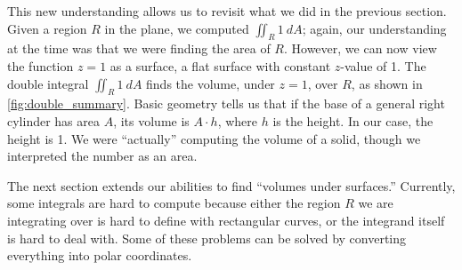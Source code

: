 This new understanding allows us to revisit what we did in the previous section. Given a region $R$ in the plane, we computed $\iint_R 1\ dA$; again, our understanding at the time was that we were finding the area of $R$. However, we can now view the function $z=1$ as a surface, a flat surface with constant $z$-value of 1. The double integral $\iint_R 1\ dA$ finds the volume, under $z=1$, over $R$, as shown in \autoref{fig:double_summary}. Basic geometry tells us that if the base of a general right cylinder has area $A$, its volume is $A\cdot h$, where $h$ is the height. In our case, the height is 1. We were ``actually'' computing the volume of a solid, though we interpreted the number as an area.

The next section extends our abilities to find ``volumes under surfaces.'' Currently, some integrals are hard to compute because either the region $R$ we are integrating over is hard to define with rectangular curves, or the integrand itself is hard to deal with. Some of these problems can be solved by converting everything into polar coordinates.

